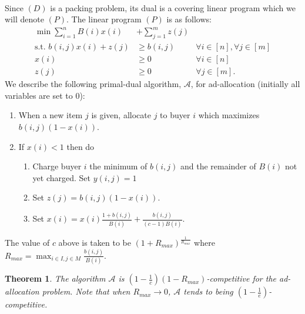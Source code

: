 \documentclass[letterpaper,12pt,oneside,onecolumn]{article}
\newcommand{\cA}{\mathcal{A}} \newcommand{\cB}{\mathcal{B}}
\newtheorem{theorem}[fact]{Theorem}
\begin{document}
\paragraph{}
Since $(D)$ is a packing problem, its dual is a covering linear program which we will denote $(P)$. The linear program $(P)$ is as follows:
\begin{align*}
\min \sum_{i=1}^nB(i)x(i) &+ \sum_{j=1}^m z(j) \\
\text{s.t. } b(i,j)x(i) + z(j) &\geq b(i,j) &\forall i \in [n], \forall j \in [m] \\
x(i) &\geq 0 &\forall i \in [n] \\
z(j) &\geq 0 &\forall j \in [m].
\end{align*}
We describe the following primal-dual algorithm, $\cA$, for ad-allocation (initially all variables are set to $0$):
\begin{enumerate}
\item When a new item $j$ is given, allocate $j$ to buyer $i$ which maximizes $b(i,j)(1-x(i))$.
\item If $x(i) < 1$ then do
	\begin{enumerate}
	\item Charge buyer $i$ the minimum of $b(i,j)$ and the remainder of $B(i)$ not yet charged. Set $y(i,j) = 1$
	\item Set $z(j) = b(i,j)(1-x(i))$.
	\item Set $x(i) = x(i)\frac{1+b(i,j)}{B(i)} + \frac{b(i,j)}{(c-1)B(i)}$.
	\end{enumerate} 
\end{enumerate}
The value of $c$ above is taken to be $(1+R_{max})^\frac{1}{R_{max}}$ where $R_{max} = \max_{i \in I, j\in M} \frac{b(i,j)}{B(i)}$.
\begin{theorem}
The algorithm $\cA$ is $(1-\frac{1}{c})(1-R_{max})$-competitive for the ad-allocation problem. Note that when $R_{max} \rightarrow 0$, $\cA$ tends to being $(1-\frac{1}{e})$-competitive.
\end{theorem}
\end{document}
